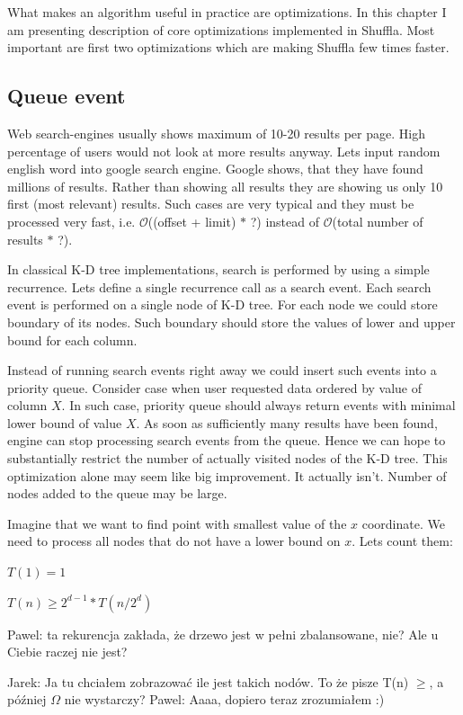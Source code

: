 \documentclass[10pt,a4paper]{article}
\newcommand{\pawel}[1]{\noindent\colorbox{myRed}{Pawel: #1}}
\newcommand{\jarek}[1]{\noindent\colorbox{myYellow}{Jarek: #1}}
\newcommand{\Oh}{\mathcal{O}}
\begin{document}
What makes an algorithm useful in practice are optimizations. In this chapter I am presenting description of core optimizations implemented in Shuffla. Most important are first two optimizations which are making Shuffla few times faster.

\subsection{Queue event}
Web search-engines usually shows maximum of 10-20 results per page. High percentage of users would not look at more results anyway. Lets input random english word into google search engine. Google shows, that they have found millions of results. Rather than showing all results they are showing us only 10 first (most relevant) results. Such cases are very typical and they must be processed very fast, i.e. $\Oh$((offset + limit) $*$ ?) instead of $\Oh$(total number of results $*$ ?).

In classical K-D tree implementations, search is performed by using a simple recurrence. Lets define a single recurrence call as a search event. Each search event is performed on a single node of K-D tree. For each node we could store boundary of its nodes. Such boundary should store the values of lower and upper bound for each column.

Instead of running search events right away we could insert such events into a priority queue. Consider case when user requested data ordered by value of column $X$. In such case, priority queue should always return events with minimal lower bound of value $X$. As soon as sufficiently many results have been found, engine can stop processing search events from the queue. Hence we can hope to substantially restrict the number of actually visited nodes of the K-D tree. This optimization alone may seem like big improvement. It actually isn't. Number of nodes added to the queue may be large.

Imagine that we want to find point with smallest value of the $x$ coordinate. We need to process all nodes
that do not have a lower bound on $x$. Lets count them:
\bigskip

$T(1) = 1$

$T(n) \geq 2^{d-1} * T(n/2^{d})$

\pawel{ta rekurencja zakłada, że drzewo jest w pełni zbalansowane, nie? Ale u Ciebie raczej nie jest?}

\jarek{Ja tu chciałem zobrazować ile jest takich nodów. To że pisze T(n) $\geq$, a później $\Omega$ nie wystarczy?}
\pawel{Aaaa, dopiero teraz zrozumiałem :)}
\end{document}
